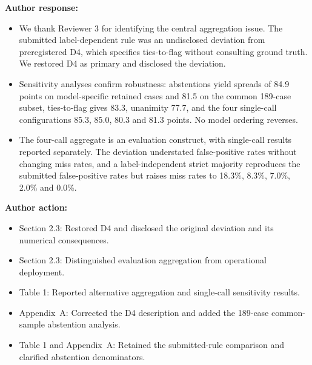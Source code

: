 \documentclass[11pt]{article}
\begin{document}
\textbf{Author response:}

\begin{itemize}

\item We thank Reviewer 3 for identifying the central aggregation issue. The submitted label-dependent rule was an undisclosed deviation from preregistered D4, which specifies ties-to-flag without consulting ground truth. We restored D4 as primary and disclosed the deviation.

\item Sensitivity analyses confirm robustness: abstentions yield spreads of 84.9 points on model-specific retained cases and 81.5 on the common 189-case subset, ties-to-flag gives 83.3, unanimity 77.7, and the four single-call configurations 85.3, 85.0, 80.3 and 81.3 points. No model ordering reverses.

\item The four-call aggregate is an evaluation construct, with single-call results reported separately. The deviation understated false-positive rates without changing miss rates, and a label-independent strict majority reproduces the submitted false-positive rates but raises miss rates to 18.3\%, 8.3\%, 7.0\%, 2.0\% and 0.0\%.

\end{itemize}

\textbf{Author action:}

\begin{itemize}

\item Section 2.3: Restored D4 and disclosed the original deviation and its numerical consequences.

\item Section 2.3: Distinguished evaluation aggregation from operational deployment.

\item Table 1: Reported alternative aggregation and single-call sensitivity results.

\item Appendix~A: Corrected the D4 description and added the 189-case common-sample abstention analysis.

\item Table 1 and Appendix~A: Retained the submitted-rule comparison and clarified abstention denominators.

\end{itemize}
\end{document}
